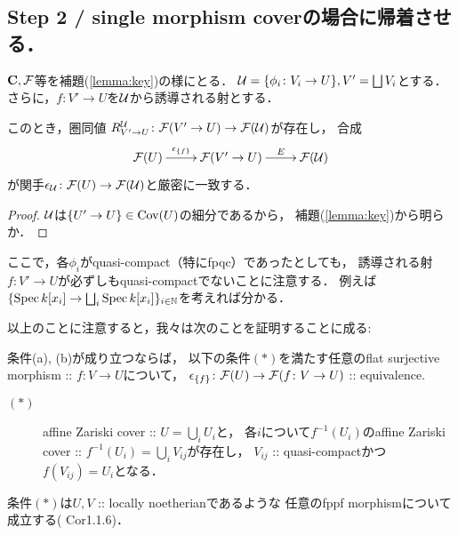 \documentclass[a4paper, dvipdfmx]{jsarticle}
\begin{document}

\subsection{Step 2 / single morphism coverの場合に帰着させる．}
    \begin{Cor}
        $\mathbf{C}, \mathcal{F}$等を補題(\ref{lemma:key})の様にとる．
        $\mathcal{U}=\{\phi_i \colon V_i \to U\}, V'=\bigsqcup V_i$とする．
        さらに，$f \colon V' \to U$を$\mathcal{U}$から誘導される射とする．

        このとき，圏同値 $R_{V' \to U}^{\mathcal{U}} \colon \mathcal{F}(V' \to U) \to \mathcal{F}(\mathcal{U})$が存在し，
        合成
        \[\xymatrix{
            \shF(U) \ar[r]^-{\epsilon_{\{f\}}}& \shF(V' \to U) \ar[r]^-{E}& \shF(\covU)
        }\]
        が関手$\epsilon_{\mathcal{U}} \colon \mathcal{F}(U) \to \mathcal{F}(\mathcal{U})$と厳密に一致する．
    \end{Cor}
    \begin{proof}
        $\mathcal{U}$は$\{U' \to U\} \in \operatorname{Cov}(U)$の細分であるから，
        補題(\ref{lemma:key})から明らか．
    \end{proof}

    \begin{Remark}
        ここで，各$\phi_i$がquasi-compact（特にfpqc）であったとしても，
        誘導される射$f \colon V' \to U$が必ずしもquasi-compactでないことに注意する．
        例えば$\{\operatorname{Spec} k[x_i] \to \bigsqcup_i \operatorname{Spec} k[x_i]\}_{i \in \mathbb{N}}$を考えれば分かる．

        以上のことに注意すると，我々は次のことを証明することに成る:
        \begin{Claim}
            条件(a), (b)が成り立つならば，
            以下の条件$(*)$を満たす任意のflat surjective morphism :: $f \colon V \to U$について，
            $\epsilon_{\{f\}} \colon \mathcal{F}(U) \to \mathcal{F}(f \colon V \to U)$ :: equivalence.
            \begin{description}
                \item[$(*)$]
                    affine Zariski cover :: $U=\bigcup_i U_i$と，
                    各$i$について$f^{-1}(U_i)$のaffine Zariski cover :: $f^{-1}(U_i)=\bigcup_i V_{ij}$が存在し，
                    $V_{ij}$ :: quasi-compactかつ$f(V_{ij})=U_i$となる．
            \end{description}
        \end{Claim}
        条件$(*)$は$U, V$ :: locally noetherianであるような
        任意のfppf morphismについて成立する(\cite{ASS} Cor1.1.6)．
    \end{Remark}
\end{document}
